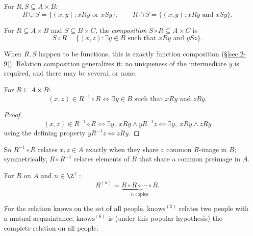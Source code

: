 \begin{definition}
For $R,S \subseteq A \times B$:
\[
R \cup S = \{(x,y) : xRy \text{ or } xSy\}, \qquad
R \cap S = \{(x,y) : xRy \text{ and } xSy\}.
\]
\end{definition}

\begin{definition}
For $R \subseteq A \times B$ and $S \subseteq B \times C$, the \emph{composition} $S \circ R \subseteq A \times C$ is
\[
S \circ R = \{(x,z) : \exists y \in B \text{ such that } xRy \text{ and } ySz\}.
\]
\end{definition}

\begin{note}
When $R,S$ happen to be functions, this is exactly function composition (\S\ref{sec:2-9}). Relation composition generalizes it: no uniqueness of the intermediate $y$ is required, and there may be several, or none.
\end{note}

\begin{proposition}
For $R \subseteq A \times B$:
\[
(x,z) \in R^{-1} \circ R \iff \exists y \in B \text{ such that } xRy \text{ and } zRy.
\]
\end{proposition}
\begin{proof}
\[
(x,z) \in R^{-1}\circ R \iff \exists y,\ xRy \wedge yR^{-1}z \iff \exists y,\ xRy \wedge zRy
\]
using the defining property $yR^{-1}z \iff zRy$.
\end{proof}

\begin{note}
So $R^{-1}\circ R$ relates $x,z \in A$ exactly when they share a common $R$-image in $B$; symmetrically, $R \circ R^{-1}$ relates elements of $B$ that share a common preimage in $A$.
\end{note}

\begin{definition}
For $R$ on $A$ and $n \in \Z^+$:
\[
R^{(n)} = \underbrace{R \circ R \circ \cdots \circ R}_{n \text{ copies}}.
\]
\end{definition}

\begin{example}
For the relation $\mathrm{knows}$ on the set of all people, $\mathrm{knows}^{(2)}$ relates two people with a mutual acquaintance; $\mathrm{knows}^{(6)}$ is (under this popular hypothesis) the complete relation on all people.
\end{example}

